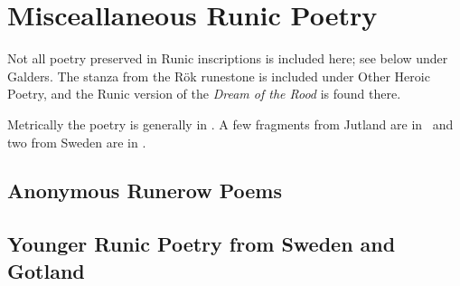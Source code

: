 \part{Misceallaneous Runic Poetry}

Not all poetry preserved in Runic inscriptions is included here; see below under Galders.  The stanza from the Rök runestone is included under Other Heroic Poetry, and the Runic version of the \emph{Dream of the Rood} is found there.

Metrically the poetry is generally in \Fornyrdislag.  A few fragments from Jutland are in \Ljodahattr\ and two from Sweden are in \Drottkvett.

\chapter{Anonymous Runerow Poems}




% 

\chapter{Younger Runic Poetry from Sweden and Gotland}




% 


% 


% 

